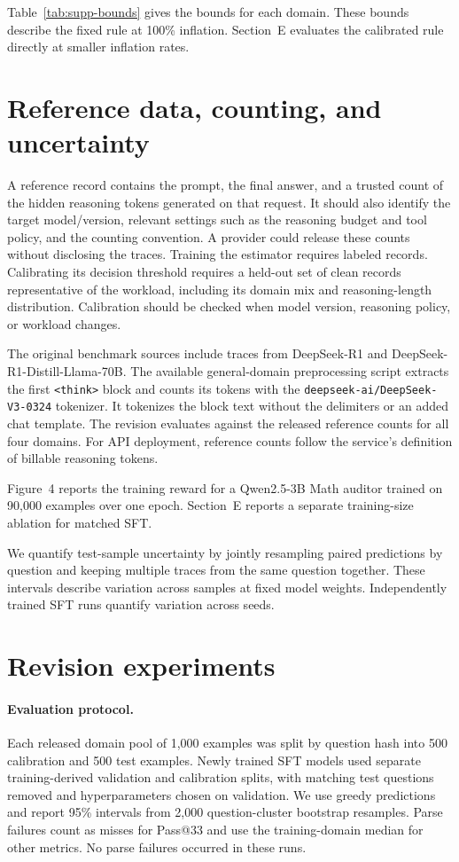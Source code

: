 \documentclass[11pt]{article}
\begin{document}
Table~\ref{tab:supp-bounds} gives the bounds for each domain. These bounds describe the fixed rule at 100\% inflation. Section~E evaluates the calibrated rule directly at smaller inflation rates.

\section{Reference data, counting, and uncertainty}
\label{app:calibration}
A reference record contains the prompt, the final answer, and a trusted count of the hidden reasoning tokens generated on that request. It should also identify the target model/version, relevant settings such as the reasoning budget and tool policy, and the counting convention. A provider could release these counts without disclosing the traces. Training the estimator requires labeled records. Calibrating its decision threshold requires a held-out set of clean records representative of the workload, including its domain mix and reasoning-length distribution. Calibration should be checked when model version, reasoning policy, or workload changes.

The original benchmark sources include traces from DeepSeek-R1 and DeepSeek-R1-Distill-Llama-70B. The available general-domain preprocessing script extracts the first \texttt{<think>} block and counts its tokens with the \texttt{deepseek-ai/DeepSeek-V3-0324} tokenizer. It tokenizes the block text without the delimiters or an added chat template. The revision evaluates against the released reference counts for all four domains. For API deployment, reference counts follow the service's definition of billable reasoning tokens.

Figure~4 reports the training reward for a Qwen2.5-3B Math auditor trained on 90,000 examples over one epoch. Section~E reports a separate training-size ablation for matched SFT.

We quantify test-sample uncertainty by jointly resampling paired predictions by question and keeping multiple traces from the same question together. These intervals describe variation across samples at fixed model weights. Independently trained SFT runs quantify variation across seeds.

\section{Revision experiments}

\paragraph{Evaluation protocol.}
Each released domain pool of 1,000 examples was split by question hash into 500 calibration and 500 test examples. Newly trained SFT models used separate training-derived validation and calibration splits, with matching test questions removed and hyperparameters chosen on validation. We use greedy predictions and report 95\% intervals from 2,000 question-cluster bootstrap resamples. Parse failures count as misses for Pass@33 and use the training-domain median for other metrics. No parse failures occurred in these runs.
\end{document}
